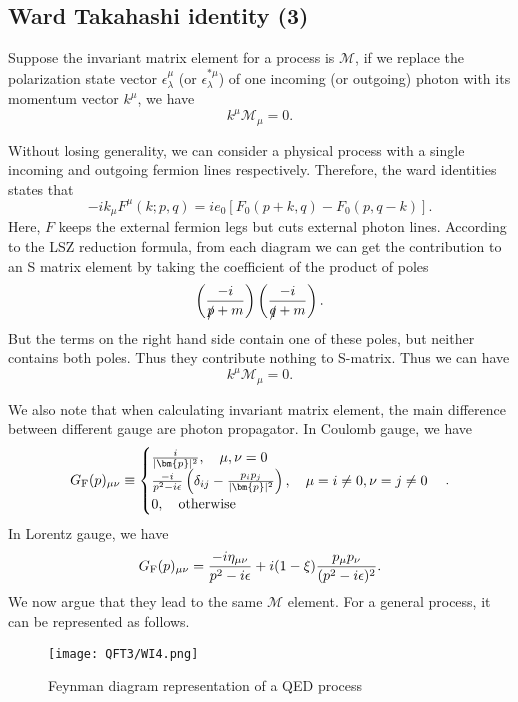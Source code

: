\subsection{Ward Takahashi identity (3)}
Suppose the invariant matrix element for a process is $\mathcal{M}$, if we replace the polarization state vector $\epsilon_{\lambda}^{\mu}$ (or $\epsilon_{\lambda}^{*\mu}$) of one incoming (or outgoing) photon with its momentum vector $k^{\mu}$, we have
\[k^{\mu} \mathcal{M}_{\mu} = 0.\]
\begin{newproof}
Without losing generality, we can consider a physical process with a single incoming and outgoing fermion lines respectively. Therefore, the ward identities states that
\[-ik_{\mu} F^{\mu}(k;p,q) = ie_0\left[F_0(p+k,q)-F_0(p,q-k)\right].\]
Here, $F$ keeps the external fermion legs but cuts external photon lines. According to the LSZ reduction formula, from each diagram we can get the contribution to an S matrix element by taking the coefficient of the product of poles
\[\left( \frac{-i}{\slashed{p}+m} \right) \left( \frac{-i}{\slashed{q}+m} \right).\] 
But the terms on the right hand side contain one of these poles, but neither contains both poles. Thus they contribute nothing to S-matrix. 
Thus we can have
\[k^{\mu} \mathcal{M}_{\mu} = 0.\] 
\end{newproof}

\noindent
We also note that when calculating invariant matrix element, the main difference between different gauge are photon propagator. In Coulomb gauge, we have
\[G_{\rm F}(p)_{\mu\nu} \equiv \begin{cases} \frac{i}{|\bm{p}|^2} , \quad \mu,\nu=0\\  \frac{-i}{p^2-i\epsilon} \left(\delta_{ij} - \frac{p_ip_j}{|\bm{p}|^2}\right) , \quad \mu = i \neq 0, \nu = j \neq 0 \\ 0 , \quad \mbox{otherwise} \end{cases} .\]
In Lorentz gauge, we have
\[G_{\rm F}(p)_{\mu\nu}  = \frac{-i\eta_{\mu\nu}}{p^2-i\epsilon} + i(1-\xi)\frac{p_{\mu}p_{\nu}}{(p^2-i\epsilon)^2} .\]
We now argue that they lead to the same $\mathcal{M}$ element.
For a general process, it can be represented as follows.

\begin{figure}[!h]
\centering
\texttt{[image: QFT3/WI4.png]}
\caption{Feynman diagram representation of a QED process}
\end{figure}

